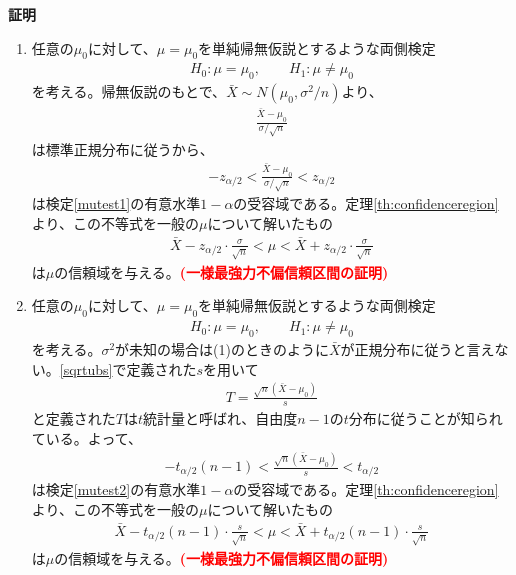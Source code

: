 \documentclass[11pt]{ltjsarticle}
\makeatletter
\theoremstyle{definition}
\newcommand{\cmt}[1]{\textcolor{red}{\textbf{(#1)}}}
\renewenvironment{proof}[1][証明]{\par
  \pushQED{\qed}%
  \normalfont \topsep6\p@\@plus6\p@\relax
  \trivlist
  \item\relax
  {\bfseries
  #1\@addpunct{.}}\hspace\labelsep\ignorespaces
}{%
  \popQED\endtrivlist\@endpefalse
}
\makeatother
\begin{document}
\begin{proof}
    \begin{enumerate}[(1)]
        \item 任意の$\mu_0$に対して、$\mu=\mu_0$を単純帰無仮説とするような両側検定
        \begin{align}\label{mutest1}
            H_0: \mu=\mu_0,\qquad H_1: \mu\neq \mu_0
        \end{align}
        を考える。帰無仮説のもとで、$\bar{X}\sim N(\mu_0, \sigma^2/n)$より、
        \begin{align}
            \frac{\bar{X}-\mu_0}{\sigma/\sqrt{n}}
        \end{align}
        は標準正規分布に従うから、
        \begin{align}
            -z_{\alpha/2} < \frac{\bar{X}-\mu_0}{\sigma/\sqrt{n}} < z_{\alpha/2}
        \end{align}
        は検定\eqref{mutest1}の有意水準$1-\alpha$の受容域である。定理\ref{th:confidenceregion}より、この不等式を一般の$\mu$について解いたもの
        \begin{align}
            \bar{X} - z_{\alpha/2}\cdot\frac{\sigma}{\sqrt{n}} < \mu < \bar{X} + z_{\alpha/2}\cdot\frac{\sigma}{\sqrt{n}}
        \end{align}
        は$\mu$の信頼域を与える。\cmt{一様最強力不偏信頼区間の証明}

        \item 任意の$\mu_0$に対して、$\mu=\mu_0$を単純帰無仮説とするような両側検定
        \begin{align}\label{mutest2}
            H_0: \mu=\mu_0,\qquad H_1: \mu\neq \mu_0
        \end{align}
        を考える。$\sigma^2$が未知の場合は(1)のときのように$\bar{X}$が正規分布に従うと言えない。\eqref{sqrtubs}で定義された$s$を用いて
        \begin{align}
            T = \frac{\sqrt{n}(\bar{X}-\mu_0)}{s}
        \end{align}
        と定義された$T$は$t$統計量と呼ばれ、自由度$n-1$の$t$分布に従うことが知られている。よって、
        \begin{align}
            -t_{\alpha/2}(n-1) < \frac{\sqrt{n}(\bar{X}-\mu_0)}{s} < t_{\alpha/2}
        \end{align}
        は検定\eqref{mutest2}の有意水準$1-\alpha$の受容域である。定理\ref{th:confidenceregion}より、この不等式を一般の$\mu$について解いたもの
        \begin{align}
            \bar{X} - t_{\alpha/2}(n-1)\cdot\frac{s}{\sqrt{n}} < \mu < \bar{X} + t_{\alpha/2}(n-1)\cdot\frac{s}{\sqrt{n}}
        \end{align}
        は$\mu$の信頼域を与える。\cmt{一様最強力不偏信頼区間の証明}
    \end{enumerate}
\end{proof}
\end{document}
